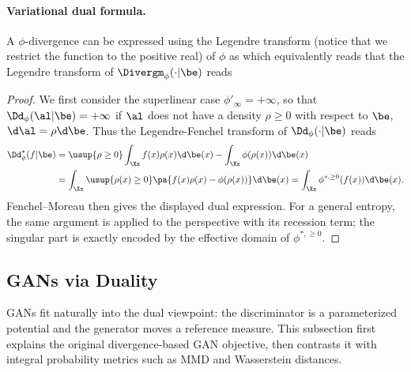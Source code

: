 \paragraph{Variational dual formula.}

\begin{proposition}
	A $\phi$-divergence can be expressed using the Legendre transform
	(notice that we restrict the function to the positive real)
	of $\phi$ as %
	which equivalently reads that the Legendre transform of $\Divergm_\phi(\cdot|\be)$ reads
\end{proposition}

\begin{proof}
		We first consider the superlinear case $\phi'_\infty=+\infty$, so that $\Dd_\phi(\al|\be)=+\infty$ if $\al$ does not have a density $\rho \geq 0$ with respect to $\be$, $\d\al=\rho \d\be$. Thus the Legendre-Fenchel transform of $\Dd_\phi(\cdot|\be)$
	reads
	\begin{align*}
		\Dd_\phi^*(f|\be) &= \usup{\rho \geq 0} \int_\Xx f(x) \rho(x)\d\be(x) - \int_\Xx \phi(\rho(x)) \d\be(x)\\
			&= \int_\Xx \usup{\rho(x) \geq 0} \pa{ f(x) \rho(x) -\phi(\rho(x)) }\d\be(x)
		= \int_\Xx \phi^{*,\geq 0}(f(x)) \d\be(x).
	\end{align*}
		Fenchel--Moreau then gives the displayed dual expression. For a general entropy, the same argument is applied to the perspective with its recession term; the singular part is exactly encoded by the effective domain of $\phi^{*,\geq0}$.
	\end{proof}


\subsection{GANs via Duality}


GANs fit naturally into the dual viewpoint: the discriminator is a parameterized potential and the generator moves a reference measure. This subsection first explains the original divergence-based GAN objective, then contrasts it with integral probability metrics such as MMD and Wasserstein distances.

